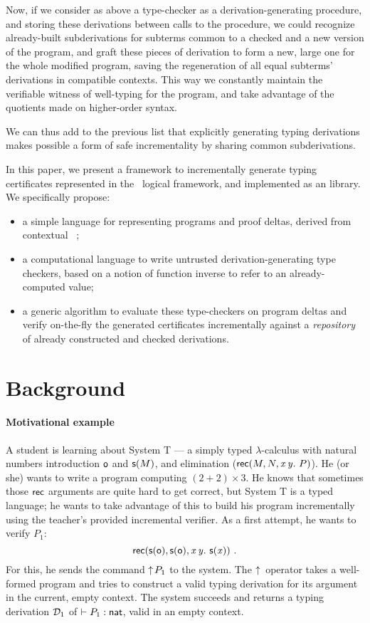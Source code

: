 \documentclass[9pt]{sigplanconf}
\begin{document}
Now, if we consider as above a type-checker as a derivation-generating
procedure, and storing these derivations between calls to the
procedure, we could recognize already-built subderivations for
subterms common to a checked and a new version of the program, and
graft these pieces of derivation to form a new, large one for the
whole modified program, saving the regeneration of all equal subterms'
derivations in compatible contexts. This way we constantly maintain
the verifiable witness of well-typing for the program, and take
advantage of the quotients made on higher-order syntax.

We can thus add to the previous list that explicitly generating typing
derivations makes possible a form of safe incrementality by sharing
common subderivations.

In this paper, we present a framework to incrementally generate typing
certificates represented in the \LF\ logical framework, and implemented
as an  library. We specifically propose:
\begin{itemize}
\item a simple language for representing programs and proof
  deltas, derived from contextual \LF\ \cite{nanevski2008contextual};
\item a computational language to write untrusted
  derivation-generating type checkers, based on a notion of function
  inverse %
  to refer to an already-computed value;
\item a generic algorithm to evaluate these type-checkers on program
  deltas and verify on-the-fly the generated certificates
  incrementally against a \emph{repository} of already constructed and
  checked derivations.
\end{itemize}

\section{Background}

\paragraph{Motivational example}

A student is learning about System \sysname T --- a simply typed
$\lambda$-calculus with natural numbers introduction $\text{\textsf{o}}$ and $\text{\textsf{s}} ({M})$,
and elimination ($\text{\textsf{rec}}({M},{N},{\text{\textit{x}}}\,{\text{\textit{y}}}.\ {P})$).  He (or she) wants to write a
program computing $(2+2)\times 3$. He knows that sometimes those
$\text{\textsf{rec}}$ arguments are quite hard to get correct, but System
\sysname T is a typed language; he wants to take advantage of this to
build his program incrementally using the teacher's provided
incremental verifier. As a first attempt, he wants to verify $P_1$:
$$
\recb{\s\z}{\s\z} x y {\s {\var x}}\ \text{.}
$$
For this, he sends the command $\uparrow\!{P_1}$ to the system. The
$\uparrow\!{}$ operator takes a well-formed program and tries to construct
a valid typing derivation for its argument in the current, empty
context. The system succeeds and returns a typing derivation $\mathcal D_1$
of \/ $\vdash P_1 : \text{\textsf{nat}}$, valid in an empty context.
\end{document}
